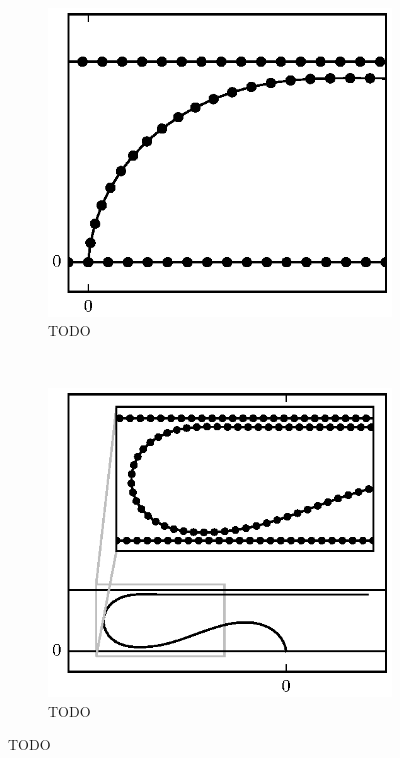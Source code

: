 \begin{figure}
		\begin{subfigure}{.5\textwidth}
			\centering
			\includegraphics{./fig/ch3/push/b1000/l3_m2.eps}
			\caption{TODO \label{subfig:push_b1000_bend}}
		\end{subfigure}%
		~	
		\begin{subfigure}{.5\textwidth}
			\centering
			\includegraphics{./fig/ch3/push/b1000/l20_m0.eps}
			\caption{TODO \label{subfig:push_b1000_bend}}
		\end{subfigure}	
		\caption{TODO\label{fig:push_bending}}	
	\end{figure}


